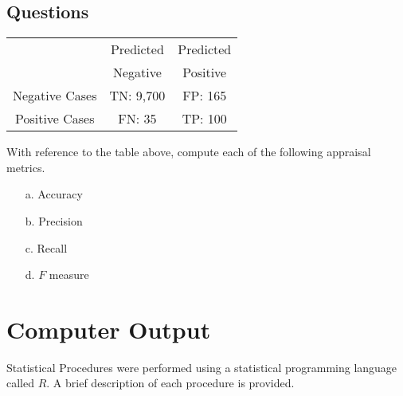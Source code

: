 \documentclass[]{article}
\begin{document}
\subsection*{Questions}
\begin{center}
\begin{tabular}{|c|c|c|}
\hline
& Predicted  & Predicted \\
 & Negative & Positive \\ \hline
Negative Cases & TN: 9,700  & FP: 165 \\ \hline
Positive Cases & FN: 35 & TP: 100 \\ \hline
\end{tabular} 
\end{center}
\newpage
With reference to the table above, compute each of the following appraisal metrics.
\begin{multicols}{2} 
\begin{itemize}
    \item[a.] Accuracy
    \item[b.] Precision
    \item[c.] Recall
    \item[d.] $F$ measure
    \end{itemize}
\end{multicols}

\section{Computer Output}
Statistical Procedures were performed using a statistical programming language called $R$.
A brief description of each procedure is provided. 
\end{document}
